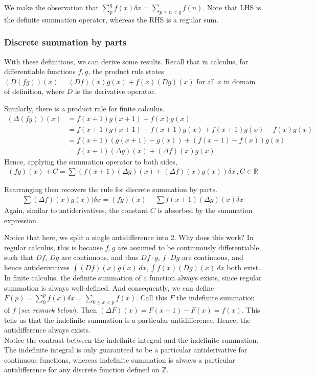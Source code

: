 \documentclass{article}
\begin{document}
We make the observation that $\sum_p^q f(x) \delta x = \sum_{p\leq n < q}f(n)$. Note that LHS is the definite summation operator, whereas the RHS is a regular sum.

\subsubsection{Discrete summation by parts}
With these definitions, we can derive some results. Recall that in calculus, for differentiable functions $f,g$, the product rule states $(D(fg))(x) = (Df)(x)g(x) + f(x)(Dg)(x)$ for all $x$ in domain of definition, where $D$ is the derivative operator.

Similarly, there is a product rule for finite calculus.
\begin{align*}
	(\Delta (fg))(x) &= f(x+1)g(x+1) - f(x)g(x)\\
	&= f(x+1)g(x+1) - f(x+1)g(x) + f(x+1)g(x) - f(x)g(x)\\
	&= f(x+1)(g(x+1)-g(x)) + (f(x+1)-f(x))g(x)\\
	&= f(x+1)(\Delta g)(x) + (\Delta f)(x)g(x)
\end{align*}
Hence, applying the summation operator to both sides,
\begin{align*}
	(fg)(x) + C = \sum (f(x+1)(\Delta g)(x) + (\Delta f)(x)g(x)) \delta x\, , C\in \mathbb{R}
\end{align*}

Rearranging then recovers the rule for discrete summation by parts.
\begin{align*}
	\sum (\Delta f)(x)g(x)) \delta x = (fg)(x) - \sum f(x+1)(\Delta g)(x) \delta x
\end{align*}
Again, similar to antiderivatives, the constant $C$ is absorbed by the summation expression.

Notice that here, we split a single antidifference into 2. Why does this work? In regular calculus, this is because $f, g$ are assumed to be continuously differentiable, such that $Df$, $Dg$ are continuous, and thus $Df\cdot g$, $f\cdot Dg$ are continuous, and hence antiderivatives $\int (Df)(x)g(x)\, dx, \int f(x)(Dg)(x)\, dx$ both exist.\\
In finite calculus, the definite summation of a function always exists, since regular summation is always well-defined. And consequently, we can define $F(p) = \sum_0^p f(x)\delta x = \sum_{0\leq x < p}f(x)$. Call this $F$ the indefinite summation of $f$ (\textit{see remark below}). Then $(\Delta F)(x) = F(x+1)-F(x) = f(x)$. This tells us that the indefinite summation is a particular antidifference.
Hence, the antidifference always exists.\\
Notice the contrast between the indefinite integral and the indefinite summation. The indefinite integral is only guaranteed to be a particular antiderivative for continuous functions, whereas indefinite summation is always a particular antidifference for any discrete function defined on $\mathbb{Z}$.
\end{document}
